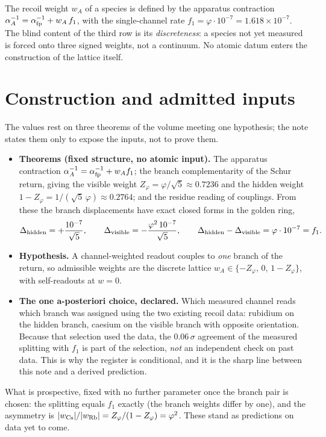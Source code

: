 \documentclass[11pt]{article}
\newcommand{\vp}{\varphi}
\newcommand{\ainv}{\alpha^{-1}}
\begin{document}
\noindent The recoil weight $w_A$ of a species is defined by the apparatus
contraction $\ainv_A=\ainv_{\rm fp}+w_A\,f_1$, with the single-channel rate
$f_1=\vp\cdot10^{-7}=1.618\times10^{-7}$. The blind content of the third row is
its \emph{discreteness}: a species not yet measured is forced onto three signed
weights, not a continuum. No atomic datum enters the construction of the lattice
itself.

\section{Construction and admitted inputs}

The values rest on three theorems of the volume meeting one hypothesis; the note
states them only to expose the inputs, not to prove them.

\begin{itemize}[leftmargin=1.4em,itemsep=2pt]
\item \textbf{Theorems (fixed structure, no atomic input).} The apparatus
contraction $\ainv_A=\ainv_{\rm fp}+w_A f_1$; the branch complementarity of the
Schur return, giving the visible weight $Z_\vp=\vp/\sqrt5\approx0.7236$ and the
hidden weight $1-Z_\vp=1/(\sqrt5\,\vp)\approx0.2764$; and the residue reading of
couplings. From these the branch displacements have exact closed forms in the
golden ring,
\[
\Delta_{\rm hidden}=+\frac{10^{-7}}{\sqrt5},\qquad
\Delta_{\rm visible}=-\frac{\vp^2\,10^{-7}}{\sqrt5},\qquad
\Delta_{\rm hidden}-\Delta_{\rm visible}=\vp\cdot10^{-7}=f_1 .
\]

\item \textbf{Hypothesis.} A channel-weighted readout couples to \emph{one}
branch of the return, so admissible weights are the discrete lattice
$w_A\in\{-Z_\vp,\,0,\,1-Z_\vp\}$, with self-readouts at $w=0$.

\item \textbf{The one a-posteriori choice, declared.} Which measured channel
reads which branch was assigned using the two existing recoil data: rubidium on
the hidden branch, caesium on the visible branch with opposite orientation.
Because that selection used the data, the $0.06\,\sigma$ agreement of the
measured splitting with $f_1$ is part of the selection, \emph{not} an independent
check on past data. This is why the register is conditional, and it is the sharp
line between this note and a derived prediction.
\end{itemize}

\noindent What is prospective, fixed with no further parameter once the branch
pair is chosen: the splitting equals $f_1$ exactly (the branch weights differ by
one), and the asymmetry is
$|w_{\rm Cs}|/|w_{\rm Rb}|=Z_\vp/(1-Z_\vp)=\vp^2$. These stand as predictions on
data yet to come.
\end{document}
